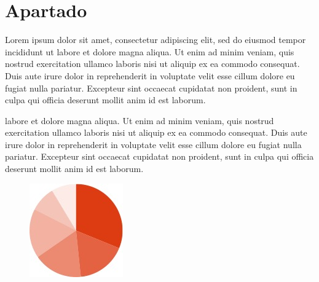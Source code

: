 \documentclass[12pt,a4paper]{report}
\newcommand{\headlinecolor}{\color{slcolor}}
\begin{document}
\section{Apartado}\label{sec:apartado}


Lorem ipsum dolor sit amet, consectetur adipiscing elit, sed do eiusmod tempor incididunt ut labore et dolore magna aliqua. Ut enim ad minim veniam, quis nostrud exercitation ullamco laboris nisi ut aliquip ex ea commodo consequat. Duis aute irure dolor in reprehenderit in voluptate velit esse cillum dolore eu fugiat nulla pariatur. Excepteur sint occaecat cupidatat non proident, sunt in culpa qui officia deserunt mollit anim id est laborum.

\begin{center}
{\textbf{\headlinecolor{Destacado duis aute irure dolor\\ 
in reprehenderit in voluptate velit esse\\ 
cillum dolore eu fugiat}}}
\end{center}

labore et dolore magna aliqua. Ut enim ad minim veniam, quis nostrud exercitation ullamco laboris nisi ut aliquip ex ea commodo consequat. Duis aute irure dolor in reprehenderit in voluptate velit esse cillum dolore eu fugiat nulla pariatur. Excepteur sint occaecat cupidatat non proident, sunt in culpa qui officia deserunt mollit anim id est laborum.

\begin{figure}[ht]
\begin{center}
\includegraphics[scale=0.5]{./Images/image5.png}
\caption{\headlinecolor{\underline{Nombre de la gráfica 1}}}

\label{fig:fig1}

\end{center}
\end{figure}
\end{document}
